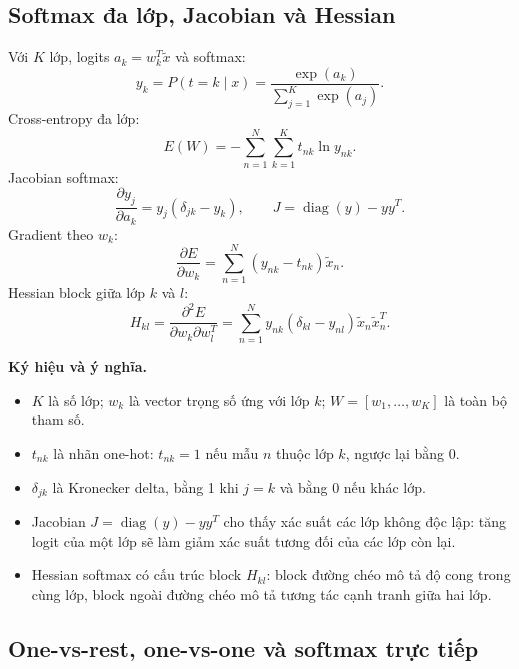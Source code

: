 \documentclass[12pt,a4paper]{article}
\begin{document}
\subsection{Softmax đa lớp, Jacobian và Hessian}
\label{subsec:softmax}

Với $K$ lớp, logits $a_k=w_k^T\tilde{x}$ và softmax:
\begin{equation}
 y_k=P(t=k\mid x)=\frac{\exp(a_k)}{\sum_{j=1}^{K}\exp(a_j)}.
\end{equation}
Cross-entropy đa lớp:
\begin{equation}
 E(W)=-\sum_{n=1}^{N}\sum_{k=1}^{K}t_{nk}\ln y_{nk}.
\end{equation}
Jacobian softmax:
\begin{equation}
 \frac{\partial y_j}{\partial a_k}=y_j(\delta_{jk}-y_k), \qquad J=\operatorname{diag}(y)-yy^T.
\end{equation}
Gradient theo $w_k$:
\begin{equation}
 \frac{\partial E}{\partial w_k}=\sum_{n=1}^{N}(y_{nk}-t_{nk})\tilde{x}_n.
\end{equation}
Hessian block giữa lớp $k$ và $l$:
\begin{equation}
 H_{kl}=\frac{\partial^2E}{\partial w_k\partial w_l^T}=\sum_{n=1}^{N}y_{nk}(\delta_{kl}-y_{nl})\tilde{x}_n\tilde{x}_n^T.
\end{equation}

\textbf{Ký hiệu và ý nghĩa.}
\begin{itemize}
  \item $K$ là số lớp; $w_k$ là vector trọng số ứng với lớp $k$; $W=[w_1,\ldots,w_K]$ là toàn bộ tham số.
  \item $t_{nk}$ là nhãn one-hot: $t_{nk}=1$ nếu mẫu $n$ thuộc lớp $k$, ngược lại bằng 0.
  \item $\delta_{jk}$ là Kronecker delta, bằng 1 khi $j=k$ và bằng 0 nếu khác lớp.
  \item Jacobian $J=\operatorname{diag}(y)-yy^T$ cho thấy xác suất các lớp không độc lập: tăng logit của một lớp sẽ làm giảm xác suất tương đối của các lớp còn lại.
  \item Hessian softmax có cấu trúc block $H_{kl}$: block đường chéo mô tả độ cong trong cùng lớp, block ngoài đường chéo mô tả tương tác cạnh tranh giữa hai lớp.
\end{itemize}

\subsection{One-vs-rest, one-vs-one và softmax trực tiếp}
\end{document}
